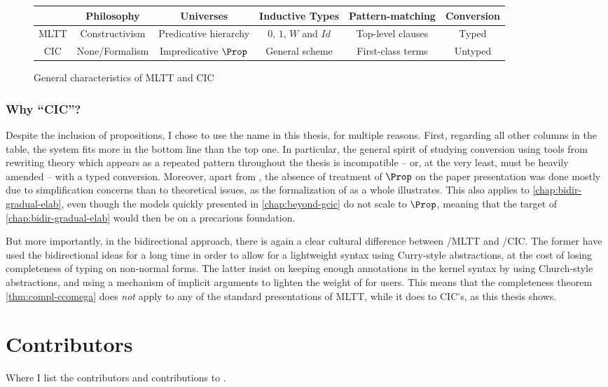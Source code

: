 \begin{figure*}[h]
  \begin{tabular}{cccccc}
    \rule{0pt}{4ex} & Philosophy & Universes & Inductive Types & Pattern-matching & Conversion \\
    \hline
    MLTT \rule{0pt}{4ex} & Constructivism & Predicative hierarchy & $0$, $1$, $W$ and $Id$ & Top-level clauses & Typed \\
    CIC \rule{0pt}{4ex} & None/Formalism & Impredicative $\Prop$ & General scheme & First-class terms & Untyped
  \end{tabular}
  \caption{General characteristics of MLTT and CIC}
  \label{fig:mltt-cic}
\end{figure*}

\subsection*{Why “CIC”?}

Despite the inclusion of propositions, I chose to use the name  in this thesis, for
multiple reasons. First, regarding all other columns in the table, the system fits more
in the bottom line than the top one. In particular, the general spirit of studying
conversion using tools from rewriting theory which appears as a repeated pattern throughout
the thesis is incompatible – or, at the very least, must be heavily amended –
with a typed conversion.
Moreover, apart from , the absence of
treatment of $\Prop$ on the paper presentation was done mostly due to simplification concerns
than to theoretical issues, as the formalization of  as a whole illustrates.
This also applies to \cref{chap:bidir-gradual-elab}, even though the models quickly presented
in \cref{chap:beyond-gcic} do not scale to $\Prop$, meaning that the target
of \cref{chap:bidir-gradual-elab} would then be on a precarious foundation.

But more importantly, in the bidirectional approach,
there is again a clear cultural difference between
/MLTT and /CIC. The former have used the bidirectional ideas for a long
time in order to allow for a lightweight syntax using Curry-style abstractions,
at the cost of losing completeness of typing on non-normal forms.%
%
The latter insist on keeping enough annotations in the kernel syntax by using Church-style
abstractions, and using a mechanism of implicit arguments to lighten the weight of
for users.
This means that the completeness theorem \cref{thm:compl-ccomega} does \emph{not} apply
to any of the standard presentations of MLTT, while it does to CIC’s, as this thesis shows.

\chapter{ Contributors}
\label{chap:meta-contrib}

Where I list the contributors and contributions to .